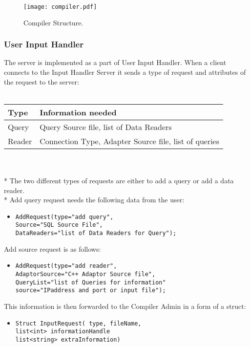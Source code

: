 \documentclass[11pt]{article}
\begin{document}
\begin{figure}
  \texttt{[image: compiler.pdf]}
  \caption{Compiler Structure.}
  \label{CompilerPicture}
\end{figure}

\subsubsection{User Input Handler}
The server is implemented as a part of User Input Handler. When a client connects to the Input Handler Server it sends a type of request and attributes of the request to the server:
\\
\\
\begin{tabular}{|l|l|}
  \hline
  Type & Information needed \\ \hline
  Query & Query Source file, list of Data Readers \\ \hline
  Reader & Connection Type, Adapter Source file, list of queries \\ \hline
\end{tabular}
\\
\\*
The two different types of requests are either to add a query or add a data reader.
\\*
Add query request needs the following data from the user:

\begin{itemize}
	\item {\tt AddRequest(type="add query",\\
		 Source="SQL Source File",\\
	     DataReaders="list of Data Readers for Query");}
\end{itemize}

\noindent Add source request is as follows:

\begin{itemize}
	\item {\tt AddRequest(type="add reader", \\
	     AdaptorSource="C++ Adaptor Source file",\\
	     QueryList="list of Queries for information"\\
	     source="IPaddress and port or input file");}
\end{itemize}

This information is then forwarded to the Compiler Admin in a form of a struct:

\begin{itemize}
	\item {\tt Struct InputRequest( type, fileName,\\
	       list<int> informationHandle \\
		   list<string> extraInformation)}
\end{itemize}
\end{document}
